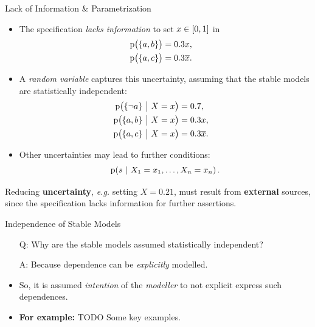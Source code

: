 \documentclass{beamer}
\newcommand{\todo}[1]{{\color{orange}TODO #1}}
\newcommand{\at}[1]{\ensuremath{\!\del{#1}}}
\newcommand{\co}[1]{\ensuremath{\overline{#1}}}
\newcommand{\pr}[1]{\ensuremath{\mathrm{p}\at{#1}}}
\newcommand{\given}{\ensuremath{~\middle|~}}
\begin{document}
\begin{frame}{Lack of Information \& Parametrization}
    \begin{itemize}
        \item The specification \textit{lacks information} to set $x\in\intcc{0,1}$ in
        $$
        \begin{aligned}
            \pr{\set{a, b}} &= 0.3 x, \cr
            \pr{\set{a, c}} &= 0.3 \co{x}.
        \end{aligned}
        $$
        \item A \textit{random variable} captures this uncertainty, \alert{assuming} that the stable models are statistically independent:
        $$
        \begin{aligned}
            \pr{\set{\neg a} \given X = x } &= 0.7, \cr
            \pr{\set{a, b} \given X = x } &= 0.3 x, \cr
            \pr{\set{a, c} \given X = x } &= 0.3 \co{x}.
        \end{aligned}
        $$
        \item Other uncertainties may lead to further conditions:
        $$
        \pr{s \given X_1 = x_1, \ldots, X_n = x_n }.
        $$ 
    \end{itemize}
    Reducing \textbf{uncertainty}, \textit{e.g.} setting $X = 0.21$, must result from \textbf{external} sources, since the specification lacks information for further assertions.
\end{frame}
\begin{frame}{Independence of Stable Models}
    
    \begin{itemize}
        \item[Q:] Why are the stable models assumed statistically independent?
        \item[A:] Because dependence can be \textit{explicitly} modelled.
        \item So, it is assumed \textit{intention} of the \textit{modeller} to not explicit express such dependences.
        \item \textbf{For example:} \todo{Some key examples}.
    \end{itemize}
\end{frame}
\end{document}
